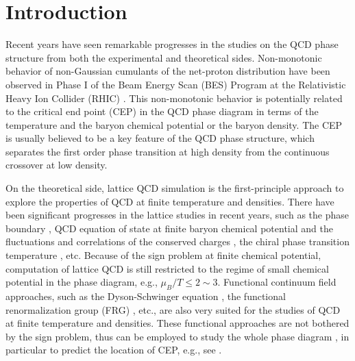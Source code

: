 \documentclass[%
reprint,
superscriptaddress,
showpacs,preprintnumbers,
 amsmath,amssymb,
 aps,
prd,
]{revtex4-1}
\begin{document}
\section{Introduction}
\label{sec:int}

Recent years have seen remarkable progresses in the studies on the QCD phase structure from both the experimental and theoretical sides. Non-monotonic behavior of non-Gaussian cumulants of the net-proton distribution have been observed in Phase I of the Beam Energy Scan (BES) Program at the Relativistic Heavy Ion Collider (RHIC) \cite{Adamczyk:2013dal,Luo:2015ewa,Luo:2017faz}. This non-monotonic behavior is potentially related to the critical end point (CEP) in the QCD phase diagram in terms of the temperature and the baryon chemical potential or the baryon density. The CEP is usually believed to be a key feature of the QCD phase structure, which separates the first order phase transition at high density from the continuous crossover at low density. 

On the theoretical side, lattice QCD simulation is the first-principle approach to explore the properties of QCD at finite temperature and densities. There have been significant progresses in the lattice studies in recent years, such as the phase boundary \cite{Bellwied:2015rza,Bazavov:2018mes}, QCD equation of state at finite baryon chemical potential and the fluctuations and correlations of the conserved charges \cite{Bazavov:2017dus,Bazavov:2017tot,Borsanyi:2018grb}, the chiral phase transition temperature \cite{Ding:2019prx}, etc. Because of the sign problem at finite chemical potential, computation of lattice QCD is still restricted to the regime of small chemical potential in the phase diagram, e.g., $\mu_B/T\le 2\sim 3$. Functional continuum field approaches, such as the Dyson-Schwinger equation \cite{Fischer:2018sdj}, the functional renormalization group (FRG) \cite{Pawlowski:2005xe}, etc., are also very suited for the studies of QCD at finite temperature and densities. These functional approaches are not bothered by the sign problem, thus can be employed to study the whole phase diagram \cite{Schaefer:2004en,Herbst:2013ail,Fischer:2018sdj}, in particular to predict the location of CEP, e.g., see \cite{Braun:2009gm,Fischer:2014ata,Gao:2015kea,Fu:2019a}.
\end{document}

